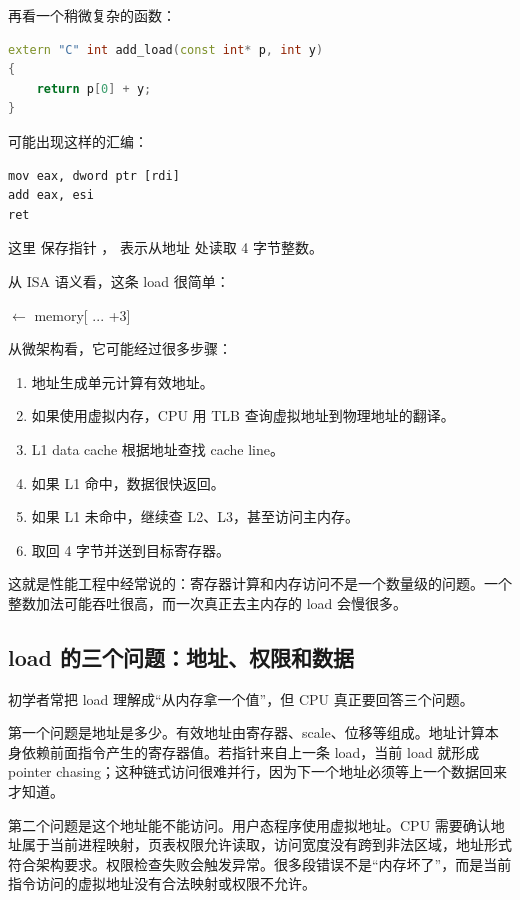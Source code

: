 再看一个稍微复杂的函数：

\begin{lstlisting}[language=C++]
extern "C" int add_load(const int* p, int y)
{
    return p[0] + y;
}
\end{lstlisting}

可能出现这样的汇编：

\begin{lstlisting}
mov eax, dword ptr [rdi]
add eax, esi
ret
\end{lstlisting}

这里  保存指针 ， 表示从地址  处读取 4 字节整数。

从 ISA 语义看，这条 load 很简单：

\begin{center}
 $\leftarrow$ memory[ ... +3]
\end{center}

从微架构看，它可能经过很多步骤：

\begin{enumerate}
  \item 地址生成单元计算有效地址。
  \item 如果使用虚拟内存，CPU 用 TLB 查询虚拟地址到物理地址的翻译。
  \item L1 data cache 根据地址查找 cache line。
  \item 如果 L1 命中，数据很快返回。
  \item 如果 L1 未命中，继续查 L2、L3，甚至访问主内存。
  \item 取回 4 字节并送到目标寄存器。
\end{enumerate}

这就是性能工程中经常说的：寄存器计算和内存访问不是一个数量级的问题。一个整数加法可能吞吐很高，而一次真正去主内存的 load 会慢很多。

\subsection{load 的三个问题：地址、权限和数据}

初学者常把 load 理解成“从内存拿一个值”，但 CPU 真正要回答三个问题。

第一个问题是地址是多少。有效地址由寄存器、scale、位移等组成。地址计算本身依赖前面指令产生的寄存器值。若指针来自上一条 load，当前 load 就形成 pointer chasing；这种链式访问很难并行，因为下一个地址必须等上一个数据回来才知道。

第二个问题是这个地址能不能访问。用户态程序使用虚拟地址。CPU 需要确认地址属于当前进程映射，页表权限允许读取，访问宽度没有跨到非法区域，地址形式符合架构要求。权限检查失败会触发异常。很多段错误不是“内存坏了”，而是当前指令访问的虚拟地址没有合法映射或权限不允许。


